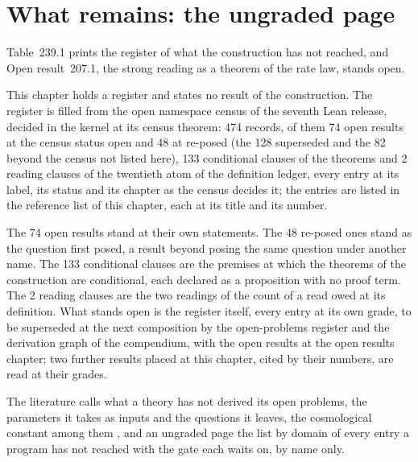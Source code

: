 \section{What remains: the ungraded page}\label{mod:XIV-7-what-remains-the-ungraded-page}
\label{narr:open:14-7}Table~239.1 prints the register of what the construction has not reached, and Open result~207.1, the strong reading as a theorem of the rate law, stands open.
\begin{chtable}\label{box:XIV-7-what-remains-the-ungraded-page:1}
This chapter holds a register and states no result of the construction. The register is filled from the open namespace census of the seventh Lean release, decided in the kernel at its census theorem: 474 records, of them 74 open results at the census status open and 48 at re-posed (the 128 superseded and the 82 beyond the census not listed here), 133 conditional clauses of the theorems and 2 reading clauses of the twentieth atom of the definition ledger, every entry at its label, its status and its chapter as the census decides it; the entries are listed in the reference list of this chapter, each at its title and its number.
\end{chtable}
The 74 open results stand at their own statements. The 48 re-posed ones stand as the question first posed, a result beyond posing the same question under another name. The 133 conditional clauses are the premises at which the theorems of the construction are conditional, each declared as a proposition with no proof term. The 2 reading clauses are the two readings of the count of a read owed at its definition. What stands open is the register itself, every entry at its own grade, to be superseded at the next composition by the open-problems register and the derivation graph of the compendium, with the open results at the open results chapter; two further results placed at this chapter, cited by their numbers, are read at their grades.
\begin{chbridge}
The literature calls what a theory has not derived its open problems, the parameters it takes as inputs and the questions it leaves, the cosmological constant among them \cite{Navas2024,Weinberg1989}, and an ungraded page the list by domain of every entry a program has not reached with the gate each waits on, by name only.
\end{chbridge}
